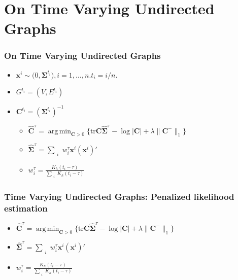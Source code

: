 \documentclass{beamer}
\newcommand{\boldSigma}{{\boldsymbol{\Sigma}}}
\DeclareMathOperator*{\argmin}{arg\,min}
\begin{document}
\section{On Time Varying Undirected Graphs}
\begin{frame}

\frametitle{On Time Varying Undirected Graphs}

\begin{itemize}
\item $\mathbf{x}^i \sim \mathcal(0, \boldSigma^{t_i}), i = 1, \dots, n. t_i = i /n$.
\item $G^{t_i} = (V, E^{t_i})$
\item $\mathbf{C}^{t_i} = (\boldSigma^{t_i})^{-1}$
    \begin{itemize}
    \item $\hat{\mathbf{C}}^{\tau} = \argmin_{\mathbf{C} > 0}\{\text{tr}\mathbf{C}\hat{\boldSigma}^{\tau} - \log |\mathbf{C}| + \lambda \| \mathbf{C}^{-} \|_1 \} $
    \item $\hat{\boldSigma}^{\tau} = \sum_{\substack{i}} w_i^{\tau} \mathbf{x}^i (\mathbf{x}^i)' $
    \item $w_i^{\tau} = \frac{K_h(t_i - \tau)}{\sum_{\substack{i}} K_h(t_i - \tau)}$
    \end{itemize}
\end{itemize}

\end{frame}



\begin{frame}

\frametitle{Time Varying Undirected Graphs: Penalized likelihood estimation}

\begin{itemize}
\item $\hat{\mathbf{C}}^{\tau} = \argmin_{\mathbf{C} > 0}\{\text{tr}\mathbf{C}\hat{\boldSigma}^{\tau} - \log |\mathbf{C}| + \lambda \| \mathbf{C}^{-} \|_1 \} $
\item $\hat{\boldSigma}^{\tau} = \sum_{\substack{i}} w_i^{\tau} \mathbf{x}^i (\mathbf{x}^i)' $
\item $w_i^{\tau} = \frac{K_h(t_i - \tau)}{\sum_{\substack{i}} K_h(t_i - \tau)}$
\end{itemize}

\end{frame}
\end{document}
